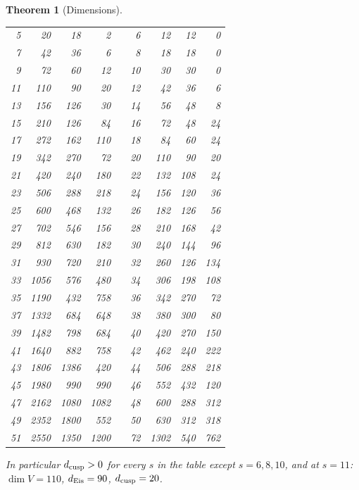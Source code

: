 \documentclass[11pt]{article}
\newtheorem{theorem}{Theorem}[section]
\theoremstyle{definition}
\theoremstyle{plain}
\begin{document}
\begin{theorem}[Dimensions]
\begin{center}
\begin{longtable}{rrrrcrrrr}
5 & 20 & 18 & 2 && 6 & 12 & 12 & 0\\
7 & 42 & 36 & 6 && 8 & 18 & 18 & 0\\
9 & 72 & 60 & 12 && 10 & 30 & 30 & 0\\
11 & 110 & 90 & 20 && 12 & 42 & 36 & 6\\
13 & 156 & 126 & 30 && 14 & 56 & 48 & 8\\
15 & 210 & 126 & 84 && 16 & 72 & 48 & 24\\
17 & 272 & 162 & 110 && 18 & 84 & 60 & 24\\
19 & 342 & 270 & 72 && 20 & 110 & 90 & 20\\
21 & 420 & 240 & 180 && 22 & 132 & 108 & 24\\
23 & 506 & 288 & 218 && 24 & 156 & 120 & 36\\
25 & 600 & 468 & 132 && 26 & 182 & 126 & 56\\
27 & 702 & 546 & 156 && 28 & 210 & 168 & 42\\
29 & 812 & 630 & 182 && 30 & 240 & 144 & 96\\
31 & 930 & 720 & 210 && 32 & 260 & 126 & 134\\
33 & 1056 & 576 & 480 && 34 & 306 & 198 & 108\\
35 & 1190 & 432 & 758 && 36 & 342 & 270 & 72\\
37 & 1332 & 684 & 648 && 38 & 380 & 300 & 80\\
39 & 1482 & 798 & 684 && 40 & 420 & 270 & 150\\
41 & 1640 & 882 & 758 && 42 & 462 & 240 & 222\\
43 & 1806 & 1386 & 420 && 44 & 506 & 288 & 218\\
45 & 1980 & 990 & 990 && 46 & 552 & 432 & 120\\
47 & 2162 & 1080 & 1082 && 48 & 600 & 288 & 312\\
49 & 2352 & 1800 & 552 && 50 & 630 & 312 & 318\\
51 & 2550 & 1350 & 1200 && 72 & 1302 & 540 & 762\\
\bottomrule
\end{longtable}
\end{center}
In particular $d_{\rm cusp}>0$ for every $s$ in the table except $s=6,8,10$, and at $s=11$: $\dim V=110$, $d_{\rm Eis}=90$, $d_{\rm cusp}=20$.
\end{theorem}
\end{document}
